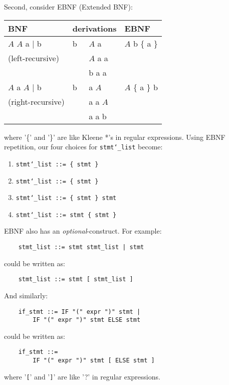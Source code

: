 \begin{slide*}
Second, consider EBNF (Extended BNF):\\

\begin{tabular}{l|l|l|l}
BNF                   & \multicolumn{2}{l|}{derivations} & EBNF \\
\hline
$A$ \RA{} $A$ a $|$ b & b & \underline{$A$} a   & $A$ \RA{} b \{ a \} \\
 (left-recursive)     &   & \underline{$A$} a a & \\
                      &   & b a a               & \\
\hline
$A$ \RA{} a $A$ $|$ b & b & a \underline{$A$}   & $A$ \RA{} \{ a \} b \\
 (right-recursive)    &   & a a \underline{$A$} & \\
                      &   & a a b               &
\end{tabular}

\vspace{0.2in}

where '\{' and '\}' are like Kleene *'s in regular expressions.  Using EBNF
repetition, our four choices for {\tt stmt\char`\_list} become:

\begin{enumerate}
\item {\tt stmt\char`\_list ::= \{ stmt \}}
\item {\tt stmt\char`\_list ::= \{ stmt \}}
\item {\tt stmt\char`\_list ::= \{ stmt \} stmt}
\item {\tt stmt\char`\_list ::= stmt \{ stmt \}}
\end{enumerate}

\vfil
\end{slide*}

\begin{slide*}
EBNF also has an {\em optional}-construct.  For example:
\begin{verbatim}
    stmt_list ::= stmt stmt_list | stmt
\end{verbatim}

could be written as:
\begin{verbatim}
    stmt_list ::= stmt [ stmt_list ]
\end{verbatim}

And similarly:

\begin{verbatim}
    if_stmt ::= IF "(" expr ")" stmt |
        IF "(" expr ")" stmt ELSE stmt
\end{verbatim}

could be written as:

\begin{verbatim}
    if_stmt ::= 
        IF "(" expr ")" stmt [ ELSE stmt ]
\end{verbatim}

where '{\tt [}' and '{\tt ]}' are like '?' in regular expressions.
\vfil
\end{slide*}


